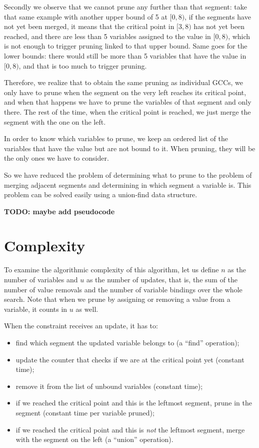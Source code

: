 \documentclass[a4paper,10pt]{article}
\begin{document}
Secondly we observe that we cannot prune any further than that segment: take that same example with another upper bound of 5 at $[0,8)$, if the segments have not yet been merged, it means that the critical point in $[3,8)$ has not yet been reached, and there are less than 5 variables assigned to the value in $[0,8)$, which is not enough to trigger pruning linked to that upper bound. Same goes for the lower bounds: there would still be more than 5 variables that have the value in $[0,8)$, and that is too much to trigger pruning.

Therefore, we realize that to obtain the same pruning as individual GCCs, we only have to prune when the segment on the very left reaches its critical point, and when that happens we have to prune the variables of that segment and only there. The rest of the time, when the critical point is reached, we just merge the segment with the one on the left.

In order to know which variables to prune, we keep an ordered list of the variables that have the value but are not bound to it. When pruning, they will be the only ones we have to consider.

So we have reduced the problem of determining what to prune to the problem of merging adjacent segments and determining in which segment a variable is. This problem can be solved easily using a union-find data structure.

\textbf{TODO: maybe add pseudocode}

\section{Complexity}

To examine the algorithmic complexity of this algorithm, let us define $n$ as the number of variables and $u$ as the number of updates, that is, the sum of the number of value removals and the number of variable bindings over the whole search. Note that when we prune by assigning or removing a value from a variable, it counts in $u$ as well.

When the constraint receives an update, it has to:
\begin{itemize}
    \item find which segment the updated variable belongs to (a ``find'' operation);
    \item update the counter that checks if we are at the critical point yet (constant time);
    \item remove it from the list of unbound variables (constant time);
    \item if we reached the critical point and this is the leftmost segment, prune in the segment (constant time per variable pruned);
    \item if we reached the critical point and this is \emph{not} the leftmost segment, merge with the segment on the left (a ``union'' operation).
\end{itemize}
\end{document}
